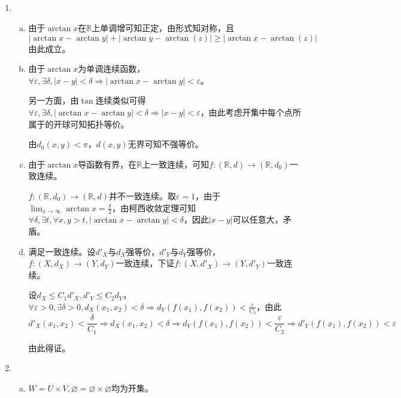 \documentclass[a4paper,UTF8,fontset=windows]{ctexart}
\begin{document}
\subsection{}
\begin{enumerate}[(1)]
    \item
    \begin{enumerate}[(a)]
    \item
    由于$\arctan{x}$在$\mathbb{R}$上单调增可知正定，由形式知对称，且
    \[|\arctan{x}-\arctan{y}|+|\arctan{y}-\arctan(z)|\ge|\arctan{x}-\arctan(z)|\]
    由此成立。
    
    \item
    由于$\arctan{x}$为单调连续函数，$\forall\varepsilon,\exists\delta,|x-y|<\delta\Rightarrow|\arctan{x}-\arctan{y}|<\varepsilon$。
    
    另一方面，由$\tan$连续类似可得$\forall\varepsilon,\exists\delta,|\arctan{x}-\arctan{y}|<\delta\Rightarrow|x-y|<\varepsilon$，由此考虑开集中每个点所属于的开球可知拓扑等价。
    
    由$d_0(x,y)<\pi$，$d(x,y)$无界可知不强等价。
    
    \item
    由于$\arctan{x}$导函数有界，在$\mathbb{R}$上一致连续，可知$f:(\mathbb{R},d)\to(\mathbb{R},d_0)$一致连续。
    
    $f:(\mathbb{R},d_0)\to(\mathbb{R},d)$并不一致连续。取$\varepsilon=1$，由于$\lim_{x\to\infty}\arctan{x}=\frac{\pi}{2}$，由柯西收敛定理可知$\forall\delta,\exists t,\forall x,y>t,|\arctan{x}-\arctan{y}|<\delta$，因此$|x-y|$可以任意大，矛盾。
    
    \item
    满足一致连续。设$d'_X$与$d_X$强等价，$d'_Y$与$d_Y$强等价，$f:(X,d_X)\to(Y,d_Y)$一致连续，下证$f:(X,d'_X)\to(Y,d'_Y)$一致连续。
    
    设$d_X\le C_1d'_X,d'_Y\le C_2d_Y$，$\forall\varepsilon>0,\exists\delta>0,d_X(x_1,x_2)<\delta\Rightarrow d_Y(f(x_1),f(x_2))<\frac{\varepsilon}{C_2}$，由此
    \[d'_X(x_1,x_2)<\frac{\delta}{C_1}\Rightarrow d_X(x_1,x_2)<\delta\Rightarrow d_Y(f(x_1),f(x_2))<\frac{\varepsilon}{C_2}\Rightarrow d'_Y(f(x_1),f(x_2))<\varepsilon\]
    
    由此得证。
    \end{enumerate}
    
    \item
    \begin{enumerate}[(a)]
    \item
    $W=U\times V,\varnothing=\varnothing\times\varnothing$均为开集。
    

\end{enumerate}
\end{enumerate}
\end{document}
